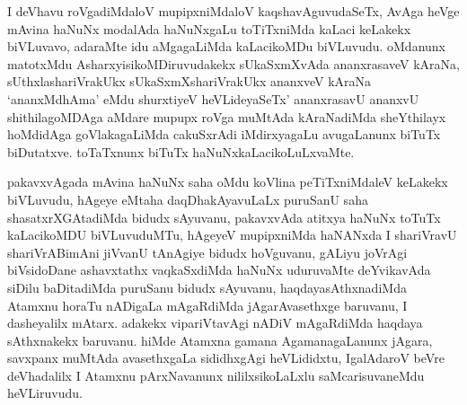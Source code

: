 
\begin{artha}
I deVhavu roVgadiMdaloV mupipxniMdaloV kaqshavAguvudaSeTx, AvAga heVge mAvina haNuNx modalAda haNuNxgaLu toTiTxniMda kaLaci keLakekx biVLuvavo, adaraMte idu aMgagaLiMda kaLacikoMDu biVLuvudu. oMdanunx matotxMdu AsharxyisikoMDiruvudakekx sUkaSxmXvAda ananxrasaveV kAraNa, sUthxlashariVrakUkx sUkaSxmXshariVrakUkx ananxveV kAraNa `ananxMdhAma' eMdu shurxtiyeV heVLideyaSeTx' ananxrasavU ananxvU shithilagoMDAga aMdare mupupx roVga muMtAda kAraNadiMda sheYthilayx hoMdidAga goVlakagaLiMda cakuSxrAdi iMdirxyagaLu avugaLanunx biTuTx biDutatxve. toTaTxnunx biTuTx haNuNxkaLacikoLuLxvaMte. 
\end{artha}%

\begin{artha}
pakavxvAgada mAvina haNuNx saha oMdu koVlina peTiTxniMdaleV keLakekx biVLuvudu, hAgeye eMtaha daqDhakAyavuLaLx puruSanU saha shasatxrXGAtadiMda bidudx sAyuvanu, pakavxvAda atitxya haNuNx toTuTx kaLacikoMDU biVLuvuduMTu, hAgeyeV mupipxniMda haNANxda I shariVravU shariVrABimAni jiVvanU tAnAgiye bidudx hoVguvanu, gALiyu joVrAgi biVsidoDane ashavxtathx vaqkaSxdiMda haNuNx uduruvaMte deYvikavAda siDilu baDitadiMda puruSanu bidudx sAyuvanu, haqdayasAthxnadiMda Atamxnu horaTu nADigaLa mAgaRdiMda jAgarAvasethxge baruvanu, I dasheyalilx mAtarx. adakekx vipariVtavAgi nADiV mAgaRdiMda haqdaya sAthxnakekx baruvanu. hiMde Atamxna gamana AgamanagaLanunx jAgara, savxpanx muMtAda avasethxgaLa sididhxgAgi heVLididxtu, IgalAdaroV beVre deVhadalilx I Atamxnu pArxNavanunx nililxsikoLaLxlu saMcarisuvaneMdu heVLiruvudu.
\end{artha}


